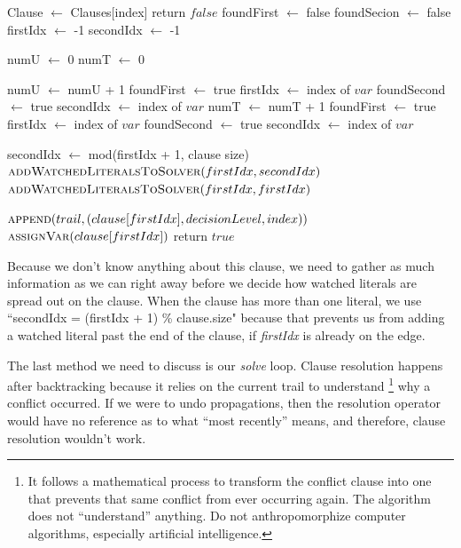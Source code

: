 \begin{algorithm}[H]
\caption{createWatched overload}\label{alg:29}
\begin{algorithmic}[1]
    \State Clause $\gets$ Clauses[index]
        \State return $false$
    \EndIf
    \State foundFirst $\gets$ false
    \State foundSecion $\gets$ false
    \State firstIdx $\gets$ -1
    \State secondIdx $\gets$ -1

    \State numU $\gets$ 0
    \State numT $\gets$ 0

            \State numU $\gets$ numU + 1
                \State foundFirst $\gets$ true
                \State firstIdx $\gets$ index of $var$
            \Else
                \State foundSecond $\gets$ true 
                \State secondIdx $\gets$ index of $var$
            \EndIf
            \State numT $\gets$ numT + 1
                \State foundFirst $\gets$ true
                \State firstIdx $\gets$ index of $var$
            \Else
                \State foundSecond $\gets$ true 
                \State secondIdx $\gets$ index of $var$
            \EndIf
        \EndIf
    \EndFor

            \State secondIdx $\gets$ mod(firstIdx + 1, clause size)
        \EndIf
        \State $\Call{addWatchedLiteralsToSolver}{firstIdx, secondIdx}$
    \Else
        \State $\Call{addWatchedLiteralsToSolver}{firstIdx, firstIdx}$
    \EndIf

        \State $\Call{append}{trail, (clause[firstIdx], decisionLevel, index)}$
        \State $\Call{assignVar}{clause[firstIdx]}$
    \EndIf
    \State return $true$
\EndProcedure
\end{algorithmic}
\end{algorithm}

Because we don't know anything about this clause, we need to gather as much 
information as we can right away before we decide how watched literals are 
spread out on the clause. When the clause has more than one literal, we 
use ``secondIdx = (firstIdx + 1) \% clause.size" because that prevents us 
from adding a watched literal past the end of the clause, if \textit{firstIdx}
is already on the edge.

The last method we need to discuss is our \textit{solve} loop. Clause 
resolution happens after backtracking because it relies on the current 
trail to understand
\footnote{It follows a mathematical process to transform the conflict clause 
into one that prevents that same conflict from ever occurring again. The 
algorithm does not ``understand'' anything. Do not anthropomorphize computer 
algorithms, especially artificial intelligence.}
why a conflict occurred. If we were to undo propagations, then the resolution 
operator would have no reference as to what ``most recently'' means, and 
therefore, clause resolution wouldn't work.

